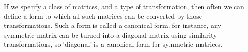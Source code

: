 If we specify a class of matrices, and a type of transformation, then often we
can define a form to which all such matrices can be converted by those
transformations. Such a form is called a canonical form. for instance, 
any symmetric matrix can be turned into a diagonal matrix using similarity 
transformations, so 'diagonal' is a canonical form for symmetric matrices.